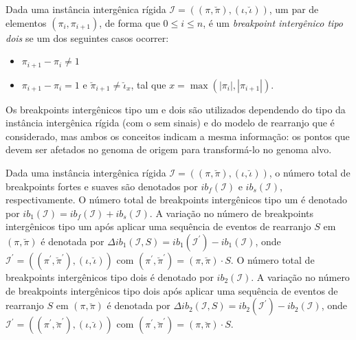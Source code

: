 \begin{definition}
  Dada uma instância intergênica rígida $\mathcal{I} = ((\pi,\breve\pi),(\iota,\breve\iota))$, um par de elementos $(\pi_{i}, \pi_{i+1})$, de forma que $0 \le i \le n$, é um \emph{breakpoint intergênico tipo dois} se um dos seguintes casos ocorrer:
  \begin{itemize}
    \item $\pi_{i+1} - \pi_{i} \ne 1$
    \item $\pi_{i+1} - \pi_{i} = 1$ e $\breve\pi_{i+1} \ne \breve\iota_{x}$, tal que $x = \max(|\pi_{i}|, |\pi_{i+1}|)$.
  \end{itemize}
\end{definition}

Os breakpoints intergênicos tipo um e dois são utilizados dependendo do tipo da instância intergênica rígida (com o sem sinais) e do modelo de rearranjo que é considerado, mas ambos os conceitos indicam a mesma informação: os pontos que devem ser afetados no genoma de origem para transformá-lo no genoma alvo.

Dada uma instância intergênica rígida $\mathcal{I} = ((\pi,\breve\pi),(\iota,\breve\iota))$, o número total de breakpoints fortes e suaves são denotados por $ib_f(\mathcal{I})$ e $ib_s(\mathcal{I})$, respectivamente. O número total de breakpoints intergênicos tipo um é denotado por $ib_{1}(\mathcal{I}) = ib_f(\mathcal{I}) + ib_s(\mathcal{I})$. A variação no número de breakpoints intergênicos tipo um após aplicar uma sequência de eventos de rearranjo $S$ em $(\pi,\breve\pi)$ é denotada por  $\Delta ib_1(\mathcal{I},S) = ib_1(\mathcal{I}^{\prime}) - ib_1(\mathcal{I})$, onde $\mathcal{I}^{\prime} = ((\pi^{\prime}, \breve\pi^{\prime}),(\iota,\breve\iota))$ com $(\pi^{\prime}, \breve\pi^{\prime}) = (\pi, \breve\pi) \cdot S$. O número total de breakpoints intergênicos tipo dois é denotado por $ib_{2}(\mathcal{I})$. A variação no número de breakpoints intergênicos tipo dois após aplicar uma sequência de eventos de rearranjo $S$ em $(\pi,\breve\pi)$ é denotada por  $\Delta ib_2(\mathcal{I},S) = ib_2(\mathcal{I}^{\prime}) - ib_2(\mathcal{I})$, onde $\mathcal{I}^{\prime} = ((\pi^{\prime}, \breve\pi^{\prime}),(\iota,\breve\iota))$ com $(\pi^{\prime}, \breve\pi^{\prime}) = (\pi, \breve\pi) \cdot S$.

